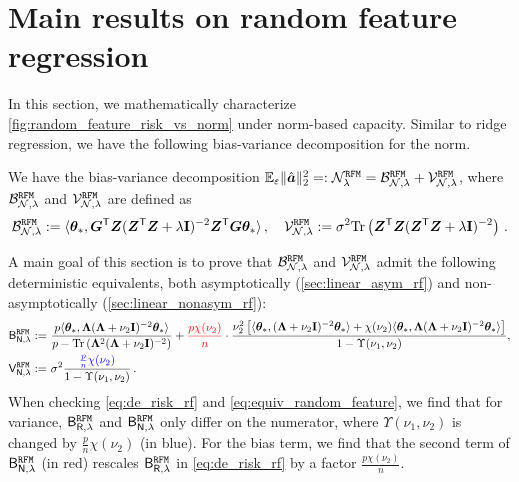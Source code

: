 \section{Main results on random feature regression}
\label{sec:rff}

In this section, we mathematically characterize \cref{fig:random_feature_risk_vs_norm} under norm-based capacity.
Similar to ridge regression, we have the following bias-variance decomposition for the norm.


\begin{lemma}
\label{lemma:biasvariance_rf}
We have the bias-variance decomposition $\mathbb{E}_{\varepsilon}\|\hat{{\boldsymbol a}}\|_2^2 =: \mathcal{N}_{\lambda}^{\tt RFM} = \mathcal{B}_{\mathcal{N},\lambda}^{\tt RFM} + \mathcal{V}_{\mathcal{N},\lambda}^{\tt RFM}$, where $\mathcal{B}_{\mathcal{N},\lambda}^{\tt RFM}$ and $\mathcal{V}_{\mathcal{N},\lambda}^{\tt RFM}$ are defined as 
\[
\begin{aligned}
    \mathcal{B}_{\mathcal{N},\lambda}^{\tt RFM} := \langle{\boldsymbol \theta}_*, \bm{G}^{\mathsf T} \bm{Z} (\bm{Z}^{\mathsf T} \bm{Z} + \lambda{\mathbf I})^{-2} \bm{Z}^{\mathsf T} \bm{G}{\boldsymbol \theta}_* \rangle\,, \quad \mathcal{V}_{\mathcal{N},\lambda}^{\tt RFM} := \sigma^2{\rm Tr}\left(\bm{Z}^{\mathsf T} \bm{Z}(\bm{Z}^{\mathsf T} \bm{Z} + \lambda{\mathbf I})^{-2}\right)\,.
\end{aligned}
\]
\end{lemma}

A main goal of this section is to prove that $\mathcal{B}^{\tt RFM}_{\mathcal{N},\lambda}$ and $\mathcal{V}^{\tt RFM}_{\mathcal{N},\lambda}$ admit the following deterministic equivalents, both  asymptotically (\cref{sec:linear_asym_rf}) and non-asymptotically (\cref{sec:linear_nonasym_rf}):
\begin{align}
    \mathsf B_{\mathsf N,\lambda}^{\tt RFM} :=&~ \frac{p\langle {\boldsymbol \theta}_*, {\boldsymbol \Lambda} ( {\boldsymbol \Lambda} + \nu_2{\mathbf I})^{-2} {\boldsymbol \theta}_* \rangle}{p - {\rm Tr}\left({\boldsymbol \Lambda}^2 ({\boldsymbol \Lambda} + \nu_2{\mathbf I})^{-2}\right)} + {\color{red}\frac{p\chi(\nu_2)}{n}} \notag \cdot \frac{\nu_2^2\left[ \langle {\boldsymbol \theta}_*, ({\boldsymbol \Lambda} + \nu_2{\mathbf I})^{-2} {\boldsymbol \theta}_* \rangle + \chi(\nu_2) \langle {\boldsymbol \theta}_*, {\boldsymbol \Lambda} ({\boldsymbol \Lambda} + \nu_2{\mathbf I})^{-2} {\boldsymbol \theta}_* \rangle \right]}{1 - \Upsilon(\nu_1, \nu_2)}, \notag \\
    \mathsf V_{\mathsf N,\lambda}^{\tt RFM} :=&~ \sigma^2 \frac{{\color{blue}\frac{p}{n}\chi(\nu_2)}}{1-\Upsilon(\nu_1, \nu_2)}\,. \label{eq:equiv_random_feature}
\end{align}
When checking \cref{eq:de_risk_rf} and \cref{eq:equiv_random_feature}, we find that for variance, $\mathsf B_{\mathsf R,\lambda}^{\tt RFM}$ and $\mathsf B_{\mathsf N,\lambda}^{\tt RFM}$ only differ on the numerator, where $\Upsilon(\nu_1,\nu_2)$ is changed by $\frac{p}{n}\chi(\nu_2)$ ({\color{blue}in blue}).  For the bias term, we find that the second term of $\mathsf B_{\mathsf N,\lambda}^{\tt RFM}$ ({\color{red}in red}) rescales $\mathsf B_{\mathsf R,\lambda}^{\tt RFM}$ in \cref{eq:de_risk_rf} by a factor $\frac{p\chi(\nu_2)}{n}$.

